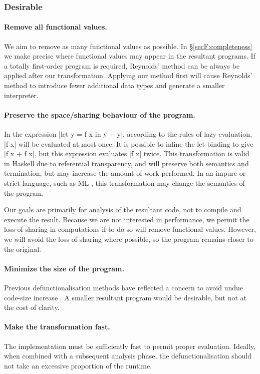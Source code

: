 \subsubsection*{Desirable}

\paragraph{Remove all functional values.} We aim to remove as many functional values as possible. In \S\ref{secF:completeness} we make precise where functional values may appear in the resultant programs. If a totally first-order program is required, Reynolds' method can be always be applied after our transformation. Applying our method first will cause Reynolds' method to introduce fewer additional data types and generate a smaller interpreter.

\paragraph{Preserve the space/sharing behaviour of the program.} In the expression |let y = f x in y + y|, according to the rules of lazy evaluation, |f x| will be evaluated at most once. It is possible to inline the let binding to give |f x + f x|, but this expression evaluates |f x| twice. This transformation is valid in Haskell due to referential transparency, and will preserve both semantics and termination, but may increase the amount of work performed. In an impure or strict language, such as ML \cite{ml}, this transformation may change the semantics of the program.

Our goals are primarily for analysis of the resultant code, not to compile and execute the result. Because we are not interested in performance, we permit the loss of sharing in computations if to do so will remove functional values. However, we will avoid the loss of sharing where possible, so the program remains closer to the original.

\paragraph{Minimize the size of the program.} Previous defunctionalisation methods have reflected a concern to avoid undue code-size increase \cite{chin:higher_order_removal}. A smaller resultant program would be desirable, but not at the cost of clarity.

\paragraph{Make the transformation fast.} The implementation must be sufficiently fast to permit proper evaluation. Ideally, when combined with a subsequent analysis phase, the defunctionalisation should not take an excessive proportion of the runtime.


